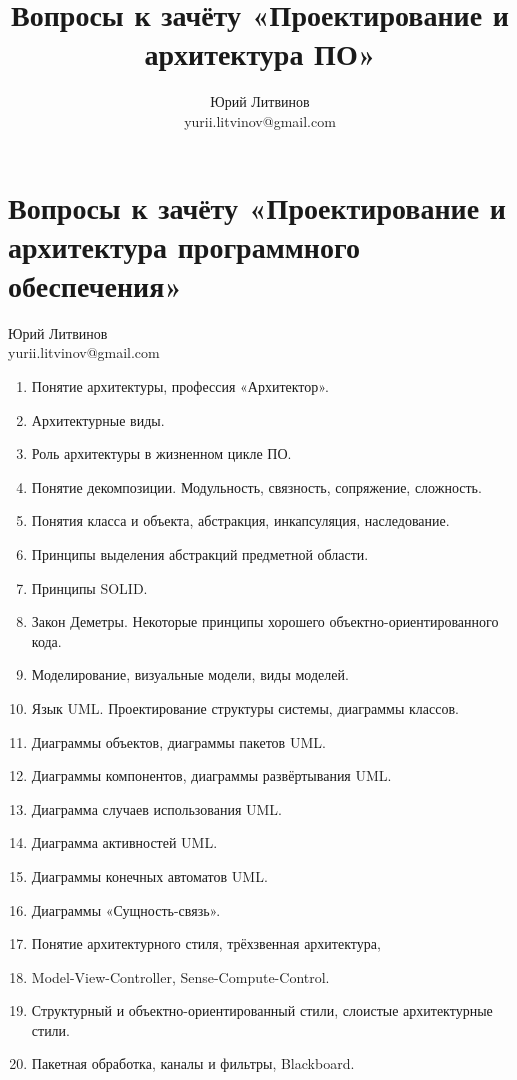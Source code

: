 \documentclass[a5paper]{article}
\title{Вопросы к зачёту «Проектирование и архитектура ПО»}
\author{Юрий Литвинов\\\small{yurii.litvinov@gmail.com}}
\begin{document}
\thispagestyle{empty}

\section*{Вопросы к зачёту «Проектирование и архитектура программного обеспечения»}

\begin{flushright}\begin{small}Юрий Литвинов\\\small{yurii.litvinov@gmail.com}\end{small}\end{flushright}

\begin{enumerate}
    \item Понятие архитектуры, профессия «Архитектор».
    \item Архитектурные виды.
    \item Роль архитектуры в жизненном цикле ПО.
    \item Понятие декомпозиции. Модульность, связность, сопряжение, сложность.
    \item Понятия класса и объекта, абстракция, инкапсуляция, наследование.
    \item Принципы выделения абстракций предметной области.
    \item Принципы SOLID.
    \item Закон Деметры. Некоторые принципы хорошего объектно-ориентированного кода.
    \item Моделирование, визуальные модели, виды моделей.
    \item Язык UML. Проектирование структуры системы, диаграммы классов.
    \item Диаграммы объектов, диаграммы пакетов UML.
    \item Диаграммы компонентов, диаграммы развёртывания UML.
    \item Диаграмма случаев использования UML.
    \item Диаграмма активностей UML.
    \item Диаграммы конечных автоматов UML.
    \item Диаграммы «Сущность-связь».
    \item Понятие архитектурного стиля, трёхзвенная архитектура, 
    \item Model-View-Controller, Sense-Compute-Control.
    \item Структурный и объектно-ориентированный стили, слоистые архитектурные стили.
    \item Пакетная обработка, каналы и фильтры, Blackboard.

\end{enumerate}
\end{document}
